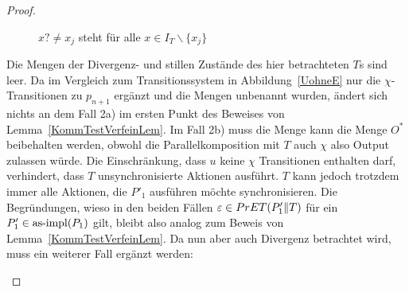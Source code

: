 \begin{proof}
\begin{itemize}
\begin{figure} [h!tbp]
\begin{center}
        \caption{$x?\neq x_j$ steht für alle $x\in I_T\backslash\{x_j\}$}
      \label{TohneEmitO}
      \end{center}
      \end{figure}
      Die Mengen der Divergenz- und stillen Zustände des hier betrachteten $T$s
      sind leer. Da im Vergleich zum Transitionssystem in
      Abbildung~\ref{UohneE} nur die $\chi$-Transitionen zu $p_{n+1}$ ergänzt
      und die Mengen unbenannt wurden, ändert sich nichts an dem Fall 2a) im
      ersten Punkt des Beweises von Lemma~\ref{KommTestVerfeinLem}. Im Fall 2b)
      muss die Menge kann die Menge $O^*$ beibehalten werden, obwohl die
      Parallelkomposition mit $T$ auch $\chi$ also Output zulassen würde. Die
      Einschränkung, dass $u$ keine $\chi$ Transitionen enthalten darf,
      verhindert, dass $T$ unsynchronisierte Aktionen ausführt. $T$ kann jedoch
      trotzdem immer alle Aktionen, die $P'_1$ ausführen möchte
      synchronisieren. Die Begründungen, wieso in den beiden Fällen
      $\varepsilon \in PrET (P'_1\|T)$ für ein $P'_1\in\mathrm{as}\text{-}\mathrm{impl} (P_1)$ gilt,
      bleibt also analog zum Beweis von Lemma~\ref{KommTestVerfeinLem}. Da nun
      aber auch Divergenz betrachtet wird, muss ein weiterer Fall ergänzt
      werden:
\end{itemize}
\end{proof}
